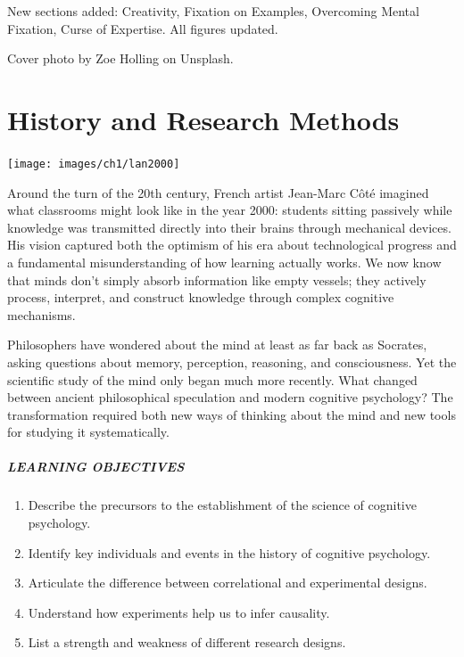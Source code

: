 \documentclass[
]{krantz}
\providecommand{\tightlist}{%
  \setlength{\itemsep}{0pt}\setlength{\parskip}{0pt}}
\begin{document}
New sections added: Creativity, Fixation on Examples, Overcoming Mental Fixation, Curse of Expertise. All figures updated.

Cover photo by Zoe Holling on Unsplash.

\chapter{History and Research Methods}\label{history-and-research-methods}

\begin{center}\texttt{[image: images/ch1/lan2000]} \end{center}

Around the turn of the 20th century, French artist Jean-Marc Côté imagined what classrooms might look like in the year 2000: students sitting passively while knowledge was transmitted directly into their brains through mechanical devices. His vision captured both the optimism of his era about technological progress and a fundamental misunderstanding of how learning actually works. We now know that minds don't simply absorb information like empty vessels; they actively process, interpret, and construct knowledge through complex cognitive mechanisms.

Philosophers have wondered about the mind at least as far back as Socrates, asking questions about memory, perception, reasoning, and consciousness. Yet the scientific study of the mind only began much more recently. What changed between ancient philosophical speculation and modern cognitive psychology? The transformation required both new ways of thinking about the mind and new tools for studying it systematically.

\paragraph*{LEARNING OBJECTIVES}\label{learning-objectives}

\begin{enumerate}
\def\labelenumi{\arabic{enumi}.}
\tightlist
\item
  Describe the precursors to the establishment of the science of cognitive psychology.
\item
  Identify key individuals and events in the history of cognitive psychology.
\item
  Articulate the difference between correlational and experimental designs.
\item
  Understand how experiments help us to infer causality.
\item
  List a strength and weakness of different research designs.
\end{enumerate}
\end{document}
